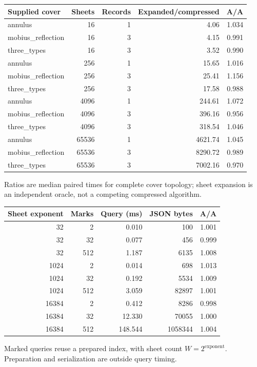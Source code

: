\begin{center}
\begin{tabular}{@{}lrrrr@{}}
\toprule
Supplied cover & Sheets & Records & Expanded/compressed & A/A \\
\midrule
annulus & 16 & 1 & 4.06 & 1.034 \\
mobius\_reflection & 16 & 3 & 4.15 & 0.991 \\
three\_types & 16 & 3 & 3.52 & 0.990 \\
annulus & 256 & 1 & 15.65 & 1.016 \\
mobius\_reflection & 256 & 3 & 25.41 & 1.156 \\
three\_types & 256 & 3 & 17.58 & 0.988 \\
annulus & 4096 & 1 & 244.61 & 1.072 \\
mobius\_reflection & 4096 & 3 & 396.16 & 0.956 \\
three\_types & 4096 & 3 & 318.54 & 1.046 \\
annulus & 65536 & 1 & 4621.74 & 1.045 \\
mobius\_reflection & 65536 & 3 & 8290.72 & 0.989 \\
three\_types & 65536 & 3 & 7002.16 & 0.970 \\
\bottomrule
\end{tabular}
\end{center}
Ratios are median paired times for complete cover topology; sheet expansion is an independent oracle, not a competing compressed algorithm.
\begin{center}
\begin{tabular}{@{}rrrrr@{}}
\toprule
Sheet exponent & Marks & Query (ms) & JSON bytes & A/A \\
\midrule
32 & 2 & 0.010 & 100 & 1.001 \\
32 & 32 & 0.077 & 456 & 0.999 \\
32 & 512 & 1.187 & 6135 & 1.008 \\
1024 & 2 & 0.014 & 698 & 1.013 \\
1024 & 32 & 0.192 & 5534 & 1.009 \\
1024 & 512 & 3.059 & 82897 & 1.001 \\
16384 & 2 & 0.412 & 8286 & 0.998 \\
16384 & 32 & 12.330 & 70055 & 1.000 \\
16384 & 512 & 148.544 & 1058344 & 1.004 \\
\bottomrule
\end{tabular}
\end{center}
Marked queries reuse a prepared index, with sheet count $W=2^{\mathrm{exponent}}$. Preparation and serialization are outside query timing.
